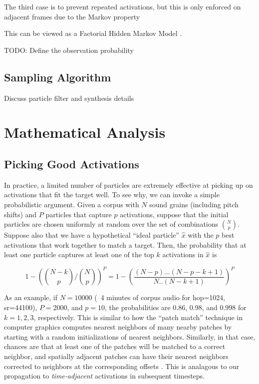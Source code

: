 \documentclass{article}
\begin{document}
    
        The third case is to prevent repeated activations, but this is only enforced on adjacent frames due to the Markov property

        This can be viewed as a Factorial Hidden Markov Model \cite{ghahramani1995factorial}.

		TODO: Define the observation probability


\subsection{Sampling Algorithm}

Discuss particle filter and synthesis details


\section{Mathematical Analysis}

\subsection{Picking Good Activations}

In practice, a limited number of particles are extremely effective at picking up on activations that fit the target well.  To see why, we can invoke a simple probabilistic argument.  Given a corpus with $N$ sound grains (including pitch shifts) and $P$ particles that capture $p$ activations, suppose that the initial particles are chosen uniformly at random over the set of combinations $\binom{N}{p}$.  Suppose also that we have a hypothetical ``ideal particle'' $\hat{x}$ with the $p$ best activations that work together to match a target.  Then, the probability that at least one particle captures at least one of the top $k$ activations in $\hat{x}$ is  

\begin{equation}
    \label{eq:initialsampleprob}
    1 - \left(\binom{N-k}{p} / \binom{N}{p}\right)^P = 1 - \left( \frac{(N-p)...(N-p-k+1)}{N..(N-k+1)}\right) ^P
\end{equation}

As an example, if $N = 10000$ (~4 minutes of corpus audio for hop=1024, sr=44100), $P = 2000$, and $p=10$, the probabilities are 0.86, 0.98, and 0.998 for $k=1, 2, 3$, respectively.  This is similar to how the ``patch match'' technique in computer graphics \cite{Barnes:2009:PAR, Barnes:2010:TGP} computes nearest neighbors of many nearby patches by starting with a random initializations of nearest neighbors.  Similarly, in that case, chances are that at least one of the patches will be matched to a correct neighbor, and spatially adjacent patches can have their nearest neighbors corrected to neighbors at the corresponding offsets \cite{Barnes:2009:PAR}.  This is analagous to our propagation to {\em time-adjacent} activations in subsequent timesteps.
\end{document}
